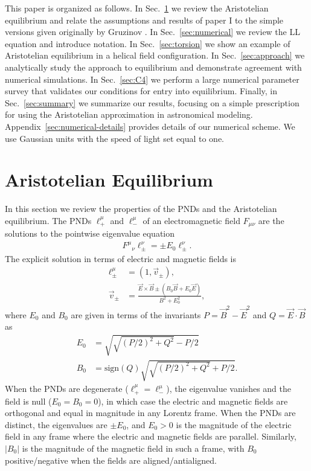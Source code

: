 \documentclass[amsmath,amssymb,nofootinbib,notitlepage,superscriptaddress,twocolumn]{revtex4-2}
\begin{document}
This paper is organized as follows.  In Sec.~\ref{sec:equilibrium} we review the Aristotelian equilibrium and relate the assumptions and results of paper I \cite{Cai:2022mkw} to the simple versions given originally by Gruzinov \cite{Gruzinov:2013pva,gruzinov2013b}.  In Sec.~\ref{sec:numerical} we review the LL equation and introduce notation.  In Sec.~\ref{sec:torsion} we show an example of Aristotelian equilibrium in a helical field configuration.  In Sec.~\ref{sec:approach} we analytically study the approach to equilibrium and demonstrate agreement with numerical simulations.  In Sec.~\ref{sec:C4} we perform a large numerical parameter survey that validates our conditions for entry into equilibrium.  Finally, in Sec.~\ref{sec:summary} we summarize our results, focusing on a simple prescription for using the Aristotelian approximation in astronomical modeling.  Appendix~\ref{sec:numerical-details} provides details of our numerical scheme.  We use Gaussian units with the speed of light set equal to one.

\section{Aristotelian Equilibrium}\label{sec:equilibrium}

In this section we review the properties of the PNDs  and the Aristotelian equilibrium.  The PNDs \cite{synge1956relativity} $\ell_+^\mu$ and $\ell_-^\mu$ of an electromagnetic field $F_{\mu \nu}$ are the solutions to the pointwise eigenvalue equation 
\begin{align}
    F^{\mu}{}_{\nu}\ell_{\pm}^\nu = \pm E_0 \ell_{\pm}^\nu.
\end{align}
The explicit solution in terms of electric and magnetic fields is
\begin{align}
\ell^\mu_{\pm} & = (1,\Vec{v}_\pm), \label{v} \\
\Vec{v}_{\pm} & =\frac{\Vec{E}\times\Vec{B}\pm(B_0\Vec{B}+E_0\Vec{E})}{B^2+E_0^2}, \label{vpm}
\end{align} 
where $E_0$ and $B_0$ are given in terms of the invariants $P=\Vec{B}^2-\Vec{E}^2$ and $Q=\Vec{E}\cdot\Vec{B}$ as 
\begin{align}
    E_0 & = \sqrt{\sqrt{(P/2)^2+Q^2}-P/2} \label{E0} \\
    B_0 & = \textrm{sign}(Q) \sqrt{\sqrt{(P/2)^2+Q^2}+P/2}. \label{B0}
\end{align}
When the PNDs are degenerate ($\ell^\mu_+=\ell^\mu_-$), the eigenvalue vanishes and the field is null ($E_0=B_0=0$), in which case the electric and magnetic fields are orthogonal and equal in magnitude in any Lorentz frame.  When the PNDs are distinct, the eigenvalues are $\pm E_0$, and $E_0>0$ is the magnitude of the electric field in any frame where the electric and magnetic fields are parallel.  Similarly, $|B_0|$ is the magnitude of the magnetic field in such a frame, with $B_0$ positive/negative when the fields are aligned/antialigned.
\end{document}
